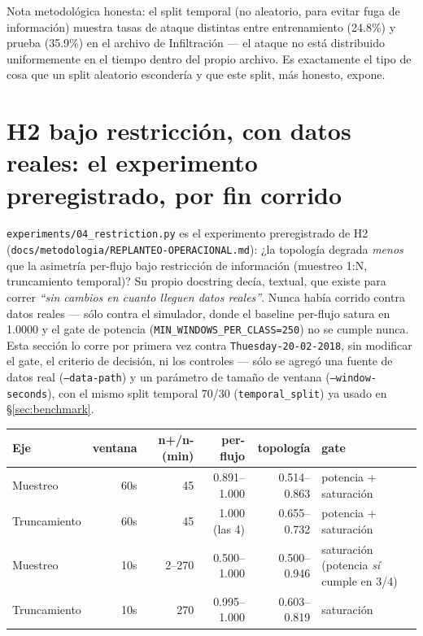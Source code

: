 \documentclass[11pt]{article}
\newcommand{\code}[1]{\texttt{\small #1}}
\begin{document}
Nota metodológica honesta: el split temporal (no aleatorio, para evitar fuga de
información) muestra tasas de ataque distintas entre entrenamiento (24.8\%) y prueba
(35.9\%) en el archivo de Infiltración --- el ataque no está distribuido uniformemente en
el tiempo dentro del propio archivo. Es exactamente el tipo de cosa que un split aleatorio
escondería y que este split, más honesto, expone.

\section{H2 bajo restricción, con datos reales: el experimento preregistrado, por fin corrido}
\label{sec:h2}

\code{experiments/04\_restriction.py} es el experimento preregistrado de H2
(\code{docs/metodologia/REPLANTEO-OPERACIONAL.md}): ¿la topología degrada \emph{menos} que la
asimetría per-flujo bajo restricción de información (muestreo 1:N, truncamiento temporal)? Su
propio docstring decía, textual, que existe para correr \textit{``sin cambios en cuanto lleguen
datos reales''}. Nunca había corrido contra datos reales --- sólo contra el simulador, donde el
baseline per-flujo satura en 1.0000 y el gate de potencia (\code{MIN\_WINDOWS\_PER\_CLASS=250}) no
se cumple nunca. Esta sección lo corre por primera vez contra \code{Thuesday-20-02-2018}, sin
modificar el gate, el criterio de decisión, ni los controles --- sólo se agregó una fuente de
datos real (\code{--data-path}) y un parámetro de tamaño de ventana (\code{--window-seconds}), con
el mismo split temporal 70/30 (\code{temporal\_split}) ya usado en \S\ref{sec:benchmark}.

\begin{center}
\begin{tabular}{@{}lrrrrl@{}}
\toprule
\textbf{Eje} & \textbf{ventana} & \textbf{n+/n- (min)} & \textbf{per-flujo} & \textbf{topología} & \textbf{gate} \\
\midrule
Muestreo    & 60s & 45 & 0.891--1.000 & 0.514--0.863 & potencia + saturación \\
Truncamiento & 60s & 45 & 1.000 (las 4) & 0.655--0.732 & potencia + saturación \\
Muestreo    & 10s & 2--270 & 0.500--1.000 & 0.500--0.946 & saturación (potencia \emph{sí} cumple en 3/4) \\
Truncamiento & 10s & 270 & 0.995--1.000 & 0.603--0.819 & saturación \\
\bottomrule
\end{tabular}
\end{center}
\end{document}
